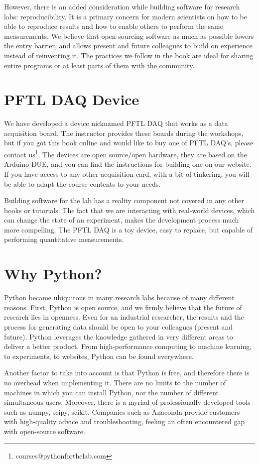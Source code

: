 However, there is an added consideration while building software for research labs: reproducibility. It is a primary concern for modern scientists on how to be able to reproduce results and how to enable others to perform the same measurements. We believe that open-sourcing software as much as possible lowers the entry barrier, and allows present and future colleagues to build on experience instead of reinventing it. The practices we follow in the book are ideal for sharing entire programs or at least parts of them with the community.

\section{PFTL DAQ Device}\label{sec:pftl-daq-device}
We have developed a device nicknamed {PFTL DAQ} that works as a data acquisition board. The instructor provides these boards during the workshops, but if you got this book online and would like to buy one of PFTL DAQ's, please contact us\footnote{courses@pythonforthelab.com}. The devices are open source/open hardware, they are based on the Arduino DUE, and you can find the instructions for building one on our website. If you have access to any other acquisition card, with a bit of tinkering, you will be able to adapt the course contents to your needs.

Building software for the lab has a reality component not covered in any other books or tutorials. The fact that we are interacting with real-world devices, which can change the state of an experiment, makes the development process much more compelling. The PFTL DAQ is a toy device, easy to replace, but capable of performing quantitative measurements.

\section{Why Python?}\label{sec:why-python?}
Python became ubiquitous in many research labs because of many different reasons. First, Python is open source, and we firmly believe that the future of research lies in openness. Even for an industrial researcher, the results and the process for generating data should be open to your colleagues (present and future). Python leverages the knowledge gathered in very different areas to deliver a better product. From high-performance computing to machine learning, to experiments, to websites, Python can be found everywhere.

Another factor to take into account is that Python is free, and therefore there is no overhead when implementing it. There are no limits to the number of machines in which you can install Python, nor the number of different simultaneous users. Moreover, there is a myriad of professionally developed tools such as numpy, scipy, scikit. Companies such as Anaconda provide customers with high-quality advice and troubleshooting, feeling an often encountered gap with open-source software.

